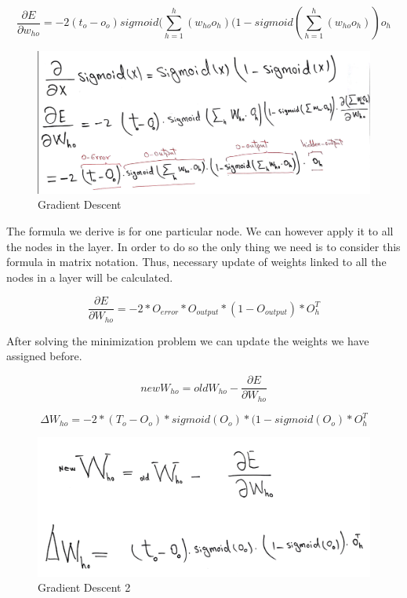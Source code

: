 \begin{equation}
\frac{\partial E}{\partial w_{ho}}=-2(t_o-o_o)sigmoid(\sum_{h=1}^{h} (w_{ho}o_h)(1-sigmoid(\sum_{h=1}^{h} (w_{ho}o_h))o_h
\end{equation}

\begin{figure}[H]
    \includegraphics[width=\linewidth]{pics/formula3.png}
    \caption{\label{fig:bp} Gradient Descent}
\end{figure}

The formula we derive is for one particular node. We can however apply it to all the nodes in the layer. In order to do so the only thing we need is to consider this formula in matrix notation. Thus, necessary update of weights linked to all the nodes in a layer will be calculated.

\begin{equation}
\frac{\partial E}{\partial W_{ho}}=-2*O_{error}*O_{output}*(1-O_{output})*O_h^T
\end{equation}

After solving the minimization problem we can update the weights we have assigned before.

\begin{equation}
new W_{ho}=old W_{ho}-\frac{\partial E}{\partial W_{ho}}
\end{equation}

\begin{equation}
\Delta W_{ho}=-2*(T_o-O_o)*sigmoid(O_o)*(1-sigmoid(O_o)*O_h^T
\end{equation}

\begin{figure}[H]
    \includegraphics[width=\linewidth]{pics/formula5.png}
    \caption{\label{fig:bp} Gradient Descent 2}
\end{figure}

